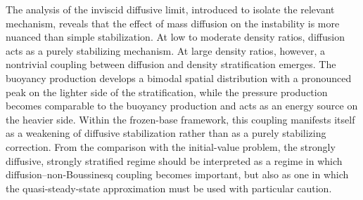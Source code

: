 \documentclass[11pt]{article}
\begin{document}
The analysis of the inviscid diffusive limit, introduced to isolate the relevant mechanism, reveals that the effect of mass diffusion on the instability is more nuanced than simple stabilization. At low to moderate density ratios, diffusion acts as a purely stabilizing mechanism. At large density ratios, however, a nontrivial coupling between diffusion and density stratification emerges. The buoyancy production develops a bimodal spatial distribution with a pronounced peak on the lighter side of the stratification, while the pressure production becomes comparable to the buoyancy production and acts as an energy source on the heavier side. Within the frozen-base framework, this coupling manifests itself as a weakening of diffusive stabilization rather than as a purely stabilizing correction. From the comparison with the initial-value problem, the strongly diffusive, strongly stratified regime should be interpreted as a regime in which diffusion--non-Boussinesq coupling becomes important, but also as one in which the quasi-steady-state approximation must be used with particular caution.
\end{document}
